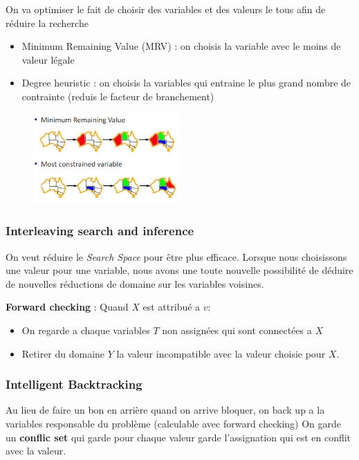 			On va optimiser le fait de choisir des variables et des valeurs le tous afin de réduire la recherche
			\begin{itemize}
				\item Minimum Remaining Value (MRV) : on choisis la variable avec le moins de valeur légale
				\item Degree heuristic : on choisis la variables qui entraine le plus grand nombre de contrainte (reduis le facteur de branchement)
			\end{itemize}
			
			\begin{figure}[htp]
				\centering
				\includegraphics[width=0.5\textwidth]{img/exVarOrd.png}

			\end{figure}
			
		\subsubsection{Interleaving search and inference}
			On veut réduire le \textit{Search Space} pour être plus efficace. Lorsque nous choisissons une valeur pour une variable, nous avons une toute nouvelle possibilité de déduire de nouvelles réductions de domaine sur les variables voisines.
			
			\textbf{Forward checking} : Quand $X$ est attribué a $v$:
			\begin{itemize}
				\item On regarde a chaque variables $T$ non assignées qui sont connectées a $X$
				\item Retirer du domaine $Y$ la valeur incompatible avec la valeur choisie pour $X$.
				
			\end{itemize}
		\subsubsection{Intelligent Backtracking}
			Au lieu de faire un bon en arrière quand on arrive bloquer, on back up a la variables responsable du problème (calculable avec forward checking)
			On garde un \textbf{conflic set} qui garde pour chaque valeur garde l'assignation qui est en conflit avec la valeur.
			
